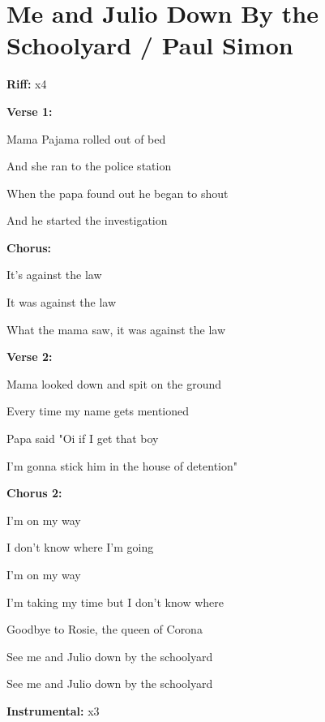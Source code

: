 \section{Me and Julio Down By the Schoolyard / Paul Simon}\label{sec:meandjulio}

\Amajor
\Dmajor
\Emajor
\Bseven

\textbf{Riff:}
 x4

\textbf{Verse 1:}

 Mama Pajama rolled out of bed

And she ran to the police station

When the papa found out he began to shout

And he started the investigation 

\textbf{Chorus:}

It's against the law

It was against the law

What the mama saw, it was against the law

\textbf{Verse 2:}

 Mama looked down and spit on the ground

Every time my name gets mentioned

Papa said "Oi if I get that boy

I'm gonna stick him in the house of detention"


\textbf{Chorus 2:}

I'm on my way

I don't know where I'm going

I'm on my way

I'm taking my time but I don't know where

Goodbye to Rosie, the queen of Corona

See me and Julio down by the schoolyard 

See me and Julio down by the schoolyard 


\textbf{Instrumental:}
 x3

